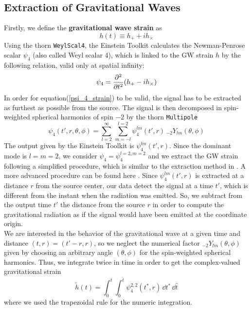 \subsection{Extraction of Gravitational Waves}
\label{gw_extraction}
Firstly, we define the \textbf{gravitational wave strain} as
\begin{equation}
\label{gravitational_wave_strain}
h(t) \equiv h_{+} + i h_{\times}
\end{equation} 
Using the thorn \texttt{WeylScal4}, the Einstein Toolkit calculates the  Newman-Penrose scalar $\psi_4$ (also called Weyl scalar 4)\cite{newman_approach_1962}, which is linked to the GW strain $h$ by the following relation, valid only at spatial infinity:
\begin{equation}
\label{psi_4_strain}
\psi_{4} = \pdv[2]{}{t} \qty(h_{+} - i h_{\times})
\end{equation}
In order for equation(\ref{psi_4_strain}) to be valid, the signal has to be extracted as furthest as possible from the source.
The signal is then decomposed in spin-weighted spherical harmonics of spin $ - 2$ by the thorn \texttt{Multipole}\cite{thorne_multipole_1980}
\[
\psi_4 (t',r,\theta,\phi)= \sum_{l=2} ^{\infty} \, \sum _{m=-l} ^{l=2} \psi^{lm} _4 (t',r) \, _{-2} Y _{lm} (\theta, \phi) 
\]
The output given by the Einstein Toolkit is  $\psi_{4} ^{lm} (t',r)$. Since the dominant  mode is $l = m = 2$,  we consider $\psi_4 = \psi_4 ^{l=2,m=2}$ and we extract the GW strain following a simplified procedure, which is similar to the extraction method in \cite{de_pietri_modeling_2016}. 
A more advanced procedure can be found here \cite{maione_spectral_2017}. 
Since $\psi^{lm} _4 (t',r)$ is extracted at a distance $r$ from the source center,  our data detect the signal at a time $t'$, which is different from the instant when the radiation was emitted.
So, we subtract from the output time $t'$ the distance from the source $r$
in order to compute the gravitational radiation as if the signal would have been emitted at the coordinate origin.\\
We are interested in the behavior of the gravitational wave at a given time and distance $(t,r) = (t'-r,r)$, so we neglect the numerical factor $_{-2} Y _{lm} (\theta, \phi)$ given by choosing an arbitrary angle $(\theta,\phi)$ for the spin-weighted spherical harmonics.
Thus, we integrate twice in time in order to get the complex-valued gravitational strain
\[
\tilde{h}(t) = \int _0 ^{t} \int _0 ^{\hat{t}} \psi_4 ^{2,2} (t^{*},r)
\, \dd t^{*} \,  \dd \hat{t}
\]
where we used the trapezoidal rule for the numeric integration.

